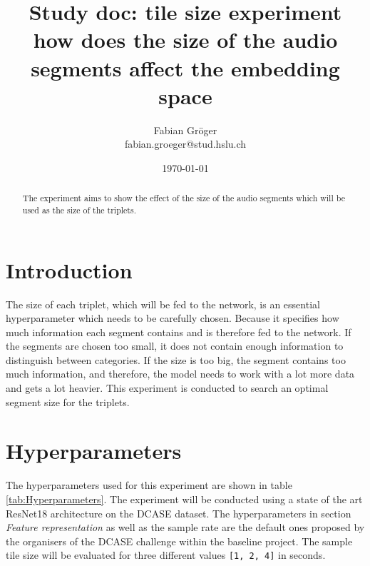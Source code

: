 \documentclass[twocolumn]{article}
\title{\huge{\textbf{Study doc: tile size experiment}}\\ \normalsize \Large{how does the size of the audio segments affect the embedding space}}
\author{Fabian Gröger\\fabian.groeger@stud.hslu.ch}
\date{\today}
\begin{document}
\maketitle

\begin{abstract}
The experiment aims to show the effect of the size of the audio segments which will be used as the size of the triplets.
\end{abstract}

\section{Introduction}
The size of each triplet, which will be fed to the network, is an essential hyperparameter which needs to be carefully chosen. Because it specifies how much information each segment contains and is therefore fed to the network. If the segments are chosen too small, it does not contain enough information to distinguish between categories. If the size is too big, the segment contains too much information, and therefore, the model needs to work with a lot more data and gets a lot heavier. This experiment is conducted to search an optimal segment size for the triplets.

\section{Hyperparameters}
The hyperparameters used for this experiment are shown in table \ref{tab:Hyperparameters}. The experiment will be conducted using a state of the art ResNet18 architecture on the DCASE dataset. The hyperparameters in section \textit{Feature representation} as well as the sample rate are the default ones proposed by the organisers of the DCASE challenge within the baseline project. The sample tile size will be evaluated for three different values \texttt{[1, 2, 4]} in seconds.
\end{document}

